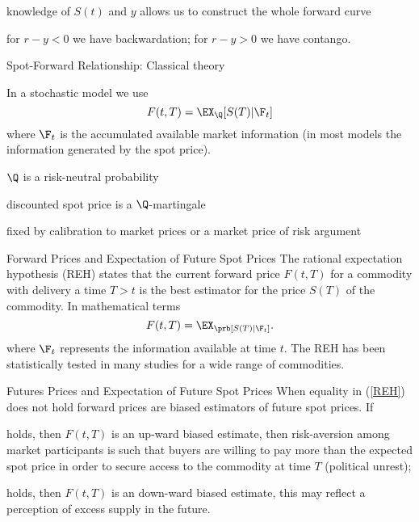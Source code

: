 	knowledge of $S(t)$ and $y$ allows us to construct the whole forward curve


	for $r-y <0$ we have backwardation; for $r-y>0$ we have contango.





{Spot-Forward Relationship: Classical theory}






	In a stochastic model we use
$$
F(t,T)=\EX_{\Q}[S(T)|\F_t]
$$
where $\F_t$ is the accumulated available market information (in most models the information generated by the spot price).


	$\Q$ is a risk-neutral probability






	discounted spot price is a $\Q$-martingale


	fixed by calibration to market prices or a market price of risk argument









{Forward Prices and Expectation of Future Spot Prices}
The rational expectation hypothesis (REH) states that the current forward price $F(t,T)$ for a commodity with
delivery a time $T>t$ is the best estimator for the price $S(T)$ of the commodity.
In mathematical terms
\begin{equation}\label{REH}
F(t,T) = \EX_\prb[S(T) |\F_t].
\end{equation}
where $\F_t$ represents the information available at time $t$. The REH has been statistically
tested in many studies for a wide range of commodities.

{Futures Prices and Expectation of Future Spot Prices}
When equality in (\ref{REH}) does not hold forward prices are biased estimators of
future spot prices. If






	holds, then $F(t,T)$ is an up-ward biased estimate, then risk-aversion
among market participants is such that buyers are willing to pay more than the expected
spot price in order to secure access to the commodity at time $T$ (political unrest);


	holds, then $F(t,T)$ is an down-ward biased estimate, this may reflect a
perception of excess supply in the future.


